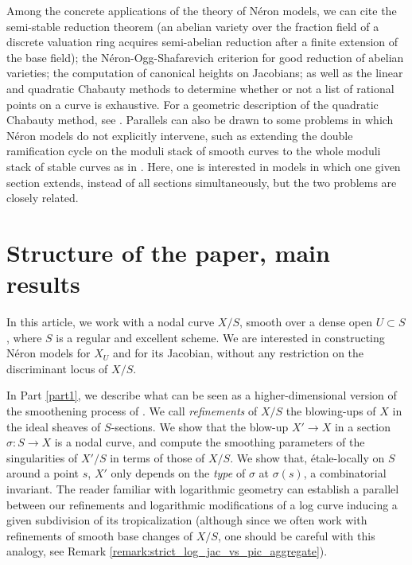 \documentclass[a4paper,12pt]{amsart} %
\numberwithin{equation}{subsection}
\theoremstyle{definition}
\theoremstyle{plain}%
\theoremstyle{remark}
\begin{document}
Among the concrete applications of the theory of N\'eron models, we can cite the semi-stable reduction theorem (an abelian variety over the fraction field of a discrete valuation ring acquires semi-abelian reduction after a finite extension of the base field); the N\'eron-Ogg-Shafarevich criterion for good reduction of abelian varieties; the computation of canonical heights on Jacobians; as well as the linear and quadratic Chabauty methods to determine whether or not a list of rational points on a curve is exhaustive. For a geometric description of the quadratic Chabauty method, see \cite{QuadChabauty}. Parallels can also be drawn to some problems in which N\'eron models do not explicitly intervene, such as extending the double ramification cycle on the moduli stack of smooth curves to the whole moduli stack of stable curves as in \cite{HolmesExtendingDRC}. Here, one is interested in models in which one given section extends, instead of all sections simultaneously, but the two problems are closely related. 

\section*{Structure of the paper, main results}

In this article, we work with a nodal curve $X/S$, smooth over a dense open $U\subset S$, where $S$ is a regular and excellent scheme. We are interested in constructing Néron models for $X_U$ and for its Jacobian, without any restriction on the discriminant locus of $X/S$.

In Part \ref{part1}, we describe what can be seen as a higher-dimensional version of the smoothening process of \cite{NeronModels}. We call \emph{refinements} of $X/S$ the blowing-ups of $X$ in the ideal sheaves of $S$-sections. We show that the blow-up $X' \to X$ in a section $\sigma\colon S \to X$ is a nodal curve, and compute the smoothing parameters of the singularities of $X'/S$ in terms of those of $X/S$. We show that, étale-locally on $S$ around a point $s$, $X'$ only depends on the \emph{type} of $\sigma$ at $\sigma(s)$, a combinatorial invariant. The reader familiar with logarithmic geometry can establish a parallel between our refinements and logarithmic modifications of a log curve inducing a given subdivision of its tropicalization (although since we often work with refinements of smooth base changes of $X/S$, one should be careful with this analogy, see Remark \ref{remark:strict_log_jac_vs_pic_aggregate}).
\end{document}
